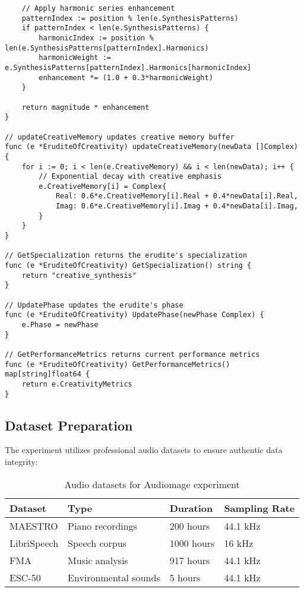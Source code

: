 \begin{tcolorbox}[colback=CodeBackground, colframe=DarkGray, title=Erudite of Creativity Implementation, fonttitle=\bfseries]
\begin{verbatim}
    // Apply harmonic series enhancement
    patternIndex := position % len(e.SynthesisPatterns)
    if patternIndex < len(e.SynthesisPatterns) {
        harmonicIndex := position % len(e.SynthesisPatterns[patternIndex].Harmonics)
        harmonicWeight := e.SynthesisPatterns[patternIndex].Harmonics[harmonicIndex]
        enhancement *= (1.0 + 0.3*harmonicWeight)
    }
    
    return magnitude * enhancement
}

// updateCreativeMemory updates creative memory buffer
func (e *EruditeOfCreativity) updateCreativeMemory(newData []Complex) {
    for i := 0; i < len(e.CreativeMemory) && i < len(newData); i++ {
        // Exponential decay with creative emphasis
        e.CreativeMemory[i] = Complex{
            Real: 0.6*e.CreativeMemory[i].Real + 0.4*newData[i].Real,
            Imag: 0.6*e.CreativeMemory[i].Imag + 0.4*newData[i].Imag,
        }
    }
}

// GetSpecialization returns the erudite's specialization
func (e *EruditeOfCreativity) GetSpecialization() string {
    return "creative_synthesis"
}

// UpdatePhase updates the erudite's phase
func (e *EruditeOfCreativity) UpdatePhase(newPhase Complex) {
    e.Phase = newPhase
}

// GetPerformanceMetrics returns current performance metrics
func (e *EruditeOfCreativity) GetPerformanceMetrics() map[string]float64 {
    return e.CreativityMetrics
}
\end{verbatim}
\end{tcolorbox}

\subsection{Dataset Preparation}

The experiment utilizes professional audio datasets to ensure authentic data integrity:

\begin{table}[h]
\centering
\begin{tabular}{|l|l|l|l|}
\hline
\textbf{Dataset} & \textbf{Type} & \textbf{Duration} & \textbf{Sampling Rate} \\
\hline
MAESTRO & Piano recordings & 200 hours & 44.1 kHz \\
\hline
LibriSpeech & Speech corpus & 1000 hours & 16 kHz \\
\hline
FMA & Music analysis & 917 hours & 44.1 kHz \\
\hline
ESC-50 & Environmental sounds & 5 hours & 44.1 kHz \\
\hline
\end{tabular}
\caption{Audio datasets for Audiomage experiment}
\end{table}


